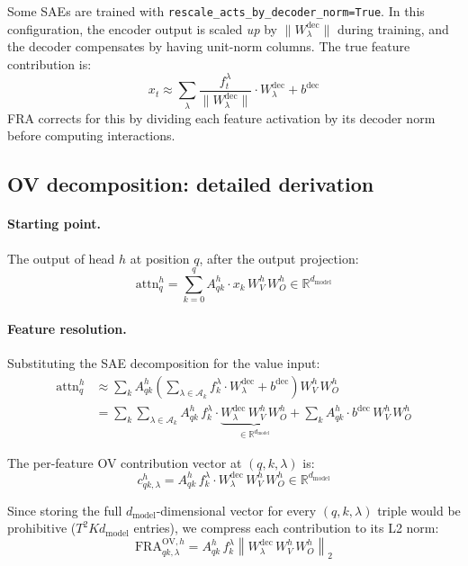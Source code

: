 \documentclass{article}
\theoremstyle{plain}
\theoremstyle{definition}
\theoremstyle{remark}
\newcommand{\Wdec}{W^{\mathrm{dec}}}
\newcommand{\WV}{W_V}
\newcommand{\WO}{W_O}
\newcommand{\dmodel}{d_{\mathrm{model}}}
\newcommand{\RR}{\mathbb{R}}
\begin{document}
Some SAEs are trained with \texttt{rescale\_acts\_by\_decoder\_norm=True}. In this configuration, the encoder output is scaled \emph{up} by $\|\Wdec_\lambda\|$ during training, and the decoder compensates by having unit-norm columns. The true feature contribution is:
\begin{equation}
    x_t \approx \sum_\lambda \frac{f_t^\lambda}{\|\Wdec_\lambda\|} \cdot \Wdec_\lambda + b^{\mathrm{dec}}
\end{equation}
FRA corrects for this by dividing each feature activation by its decoder norm before computing interactions.

\subsection{OV decomposition: detailed derivation}
\label{app:ov_derivation}

\paragraph{Starting point.} The output of head $h$ at position $q$, after the output projection:
\begin{equation}
    \mathrm{attn}^h_q = \sum_{k=0}^{q} A^h_{qk} \cdot x_k\,\WV^h\,\WO^h \in \RR^{\dmodel}
\end{equation}

\paragraph{Feature resolution.} Substituting the SAE decomposition for the value input:
\begin{align}
    \mathrm{attn}^h_q &\approx \sum_k A^h_{qk} \left( \sum_{\lambda \in \mathcal{A}_k} f_k^\lambda \cdot \Wdec_\lambda + b^{\mathrm{dec}} \right) \WV^h\,\WO^h \\
    &= \sum_k \sum_{\lambda \in \mathcal{A}_k} A^h_{qk}\, f_k^\lambda \cdot \underbrace{\Wdec_\lambda\,\WV^h\,\WO^h}_{\in \RR^{\dmodel}} + \sum_k A^h_{qk} \cdot b^{\mathrm{dec}}\,\WV^h\,\WO^h
\end{align}

The per-feature OV contribution vector at $(q, k, \lambda)$ is:
\begin{equation}
    c^h_{qk,\lambda} = A^h_{qk}\, f_k^\lambda \cdot \Wdec_\lambda\,\WV^h\,\WO^h \in \RR^{\dmodel}
\end{equation}

Since storing the full $\dmodel$-dimensional vector for every $(q,k,\lambda)$ triple would be prohibitive ($T^2 K \dmodel$ entries), we compress each contribution to its L2 norm:
\begin{equation}
    \mathrm{FRA}^{\mathrm{OV},h}_{qk,\lambda} = A^h_{qk}\, f_k^\lambda \left\| \Wdec_\lambda\,\WV^h\,\WO^h \right\|_2
\end{equation}
\end{document}
